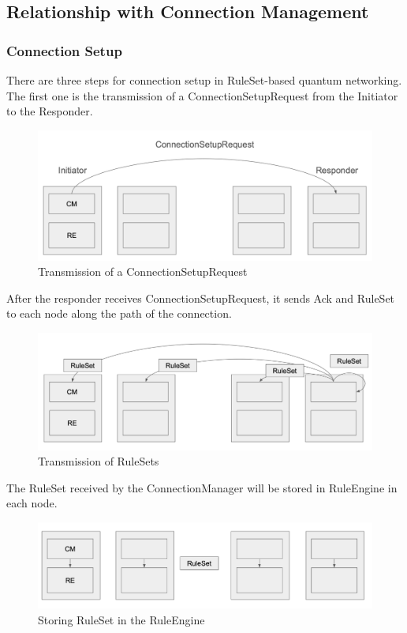 \subsection{Relationship with Connection Management}
\subsubsection{Connection Setup}

There are three steps for connection setup in RuleSet-based quantum networking. 
The first one is the transmission of a ConnectionSetupRequest from the Initiator to the Responder.
\begin{figure}[H]
  \centerline{\includegraphics[width=\columnwidth]{images/connection_setup_request.png}}
  \caption{Transmission of a ConnectionSetupRequest}
\end{figure}

After the responder receives ConnectionSetupRequest, it sends Ack and RuleSet to each node along the path of the connection.
\begin{figure}[H]
  \centerline{\includegraphics[width=\columnwidth]{images/ack_and_ruleset.png}}
  \caption{Transmission of RuleSets}
\end{figure}

The RuleSet received by the ConnectionManager will be stored in RuleEngine in each node.
\begin{figure}[H]
  \centerline{\includegraphics[width=\columnwidth]{images/ruleset_in_rule_engine.png}}
  \caption{Storing RuleSet in the RuleEngine}
\end{figure}

